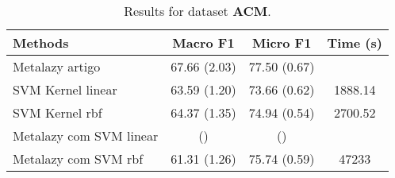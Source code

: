 \documentclass{article}
\begin{document}
			
	\begin{table}[t]
		\small
		\centering	
		\begin{tabular}{l c c c}	
			\toprule
			\textbf{Methods} & \textbf{Macro F1} & \textbf{Micro F1} & \textbf{Time (s)} \\
			\midrule    
			Metalazy artigo &  67.66 (2.03) &  77.50 (0.67) & \\
			SVM Kernel linear & 63.59 (1.20) & 73.66 (0.62) & 1888.14\\
			SVM Kernel rbf &  64.37 (1.35) & 74.94 (0.54) & 2700.52\\
			Metalazy com SVM linear &  ()  &  () &  \\	
			Metalazy com SVM rbf & 61.31 (1.26)  & 75.74 (0.59) & 47233\\	
			\bottomrule 
		\end{tabular}
		\caption{Results for dataset \textbf{ACM}.}
		\label{tab:dataset_ACM}
	\end{table}
	




\begin{comment}
\begin{table}[t]
	\small
	\centering	
	\begin{tabular}{c c c}	
		\toprule
		\textbf{Methods} & & \textbf{STANFORD\_TWEETS}\\
		\midrule    
		\multirow{2}{*}{METALAZY}& macro F1  \\ &micro F1 \\	
		\bottomrule 
	\end{tabular}
	\caption{The cardinality of $P$ and $F$ for different cities.}
	\label{tab:dataset}
\end{table}
\end{comment}



\begin{comment}
\begin{table}[t]
	\small
	\centering	
	\begin{tabular}{l c c}	
		\toprule
		\textbf{} & pred:Positive & pred:Negative \\
		\midrule    
		Positive & 29 & 6\\
		Negative & 4 & 32 \\
		\bottomrule 
	\end{tabular}
	\caption{Confusion matrix svm kernel rbf.}
	\label{tab:dataset_Stanford}
\end{table}
\end{comment}

%
%
\end{document}

